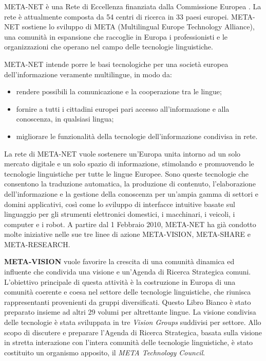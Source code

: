\vspace*{-5mm}
\begin{multicols}{2}
META-NET \`{e} una Rete di Eccellenza finanziata dalla Commissione Europea \cite{rehm2011}. La rete \`{e} attualmente composta da 54 centri di ricerca in  33 paesi europei. META-NET sostiene lo sviluppo di META (Multilingual Europe Technology Alliance), una comunit\`{a} in espansione che raccoglie in Europa i professionisti e le organizzazioni che operano nel campo delle tecnologie linguistiche.

META-NET intende porre le basi tecnologiche per una societ\`{a} europea dell'informazione veramente multilingue, in modo da:

\begin{itemize}
\item rendere possibili la comunicazione e la cooperazione tra le lingue;
\item fornire a tutti i cittadini europei pari accesso all'informazione e alla conoscenza, in qualsiasi lingua;
\item migliorare le funzionalit\`{a} della tecnologie dell'informazione condivisa in rete.
\end{itemize}

La rete di META-NET vuole sostenere un'Europa unita intorno ad un solo mercato digitale e un solo spazio di informazione, stimolando e promuovendo le tecnologie linguistiche per tutte le lingue Europee. Sono queste tecnologie che consentono la traduzione automatica, la produzione di contenuto, l'elaborazione dell'informazione e la gestione della conoscenza per un'ampia gamma di settori e domini applicativi, cos\`{i} come lo sviluppo di interfacce intuitive basate sul linguaggio per gli strumenti elettronici domestici, i macchinari, i veicoli, i computer e i robot. A partire dal 1 Febbraio 2010, META-NET ha gi\`{a} condotto molte iniziative nelle sue tre linee di azione META-VISION, META-SHARE e META-RESEARCH.

\textbf{META-VISION} vuole favorire la crescita di una comunit\`{a} dinamica ed influente che condivida una visione e un'Agenda di Ricerca Strategica comuni. L'obiettivo principale di questa attivit\`{a} \`{e} la costruzione in Europa di una comunit\`{a} coerente e coesa nel settore delle tecnologie linguistiche, che riunisca rappresentanti provenienti da gruppi diversificati. Questo Libro Bianco \`{e} stato preparato insieme ad altri 29 volumi per altrettante lingue. La visione condivisa delle tecnologie \`{e} stata sviluppata in tre \emph{Vision Groups} suddivisi per settore. Allo scopo di discutere e preparare l'Agenda di Ricerca Strategica, basata sulla visione in stretta interazione con l'intera comunit\`{a} delle tecnologie linguistiche, \`{e} stato costituito un organismo apposito, il \emph{META Technology Council}.


\end{multicols}
